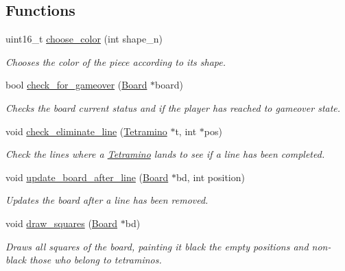 \subsection*{Functions}
\begin{DoxyCompactItemize}
\item 
uint16\+\_\+t \mbox{\hyperlink{group__tetramino_gaec1f53f8b300eba51c8863f3fcb5478b}{choose\+\_\+color}} (int shape\+\_\+n)
\begin{DoxyCompactList}\small\item\em Chooses the color of the piece according to its shape. \end{DoxyCompactList}\item 
bool \mbox{\hyperlink{group__tetramino_gaed055860f4584eb217234f06c29d3ab4}{check\+\_\+for\+\_\+gameover}} (\mbox{\hyperlink{struct_board}{Board}} $\ast$board)
\begin{DoxyCompactList}\small\item\em Checks the board current status and if the player has reached to gameover state. \end{DoxyCompactList}\item 
void \mbox{\hyperlink{group__tetramino_gaab50f02f99355b3ceb43290e186fe609}{check\+\_\+eliminate\+\_\+line}} (\mbox{\hyperlink{struct_tetramino}{Tetramino}} $\ast$t, int $\ast$pos)
\begin{DoxyCompactList}\small\item\em Check the lines where a \mbox{\hyperlink{struct_tetramino}{Tetramino}} lands to see if a line has been completed. \end{DoxyCompactList}\item 
void \mbox{\hyperlink{group__tetramino_ga2f2a68722efc3ecbd82eea0a337f6b7f}{update\+\_\+board\+\_\+after\+\_\+line}} (\mbox{\hyperlink{struct_board}{Board}} $\ast$bd, int position)
\begin{DoxyCompactList}\small\item\em Updates the board after a line has been removed. \end{DoxyCompactList}\item 
void \mbox{\hyperlink{group__tetramino_ga64e78e0b93dcd6d9b3092b4b8d1fd339}{draw\+\_\+squares}} (\mbox{\hyperlink{struct_board}{Board}} $\ast$bd)
\begin{DoxyCompactList}\small\item\em Draws all squares of the board, painting it black the empty positions and non-\/black those who belong to tetraminos. \end{DoxyCompactList}\item 

\end{DoxyCompactItemize}
